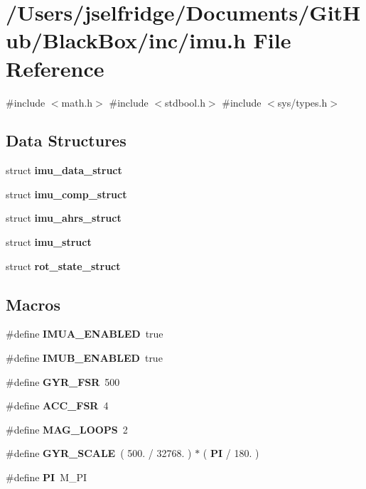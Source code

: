 \section{/\+Users/jselfridge/\+Documents/\+Git\+Hub/\+Black\+Box/inc/imu.h File Reference}
\label{imu_8h}
{\ttfamily \#include $<$math.\+h$>$}\newline
{\ttfamily \#include $<$stdbool.\+h$>$}\newline
{\ttfamily \#include $<$sys/types.\+h$>$}\newline
\subsection*{Data Structures}
\begin{DoxyCompactItemize}
\item 
struct \textbf{ imu\+\_\+data\+\_\+struct}
\item 
struct \textbf{ imu\+\_\+comp\+\_\+struct}
\item 
struct \textbf{ imu\+\_\+ahrs\+\_\+struct}
\item 
struct \textbf{ imu\+\_\+struct}
\item 
struct \textbf{ rot\+\_\+state\+\_\+struct}
\end{DoxyCompactItemize}
\subsection*{Macros}
\begin{DoxyCompactItemize}
\item 
\#define \textbf{ I\+M\+U\+A\+\_\+\+E\+N\+A\+B\+L\+ED}~true
\item 
\#define \textbf{ I\+M\+U\+B\+\_\+\+E\+N\+A\+B\+L\+ED}~true
\item 
\#define \textbf{ G\+Y\+R\+\_\+\+F\+SR}~500
\item 
\#define \textbf{ A\+C\+C\+\_\+\+F\+SR}~4
\item 
\#define \textbf{ M\+A\+G\+\_\+\+L\+O\+O\+PS}~2
\item 
\#define \textbf{ G\+Y\+R\+\_\+\+S\+C\+A\+LE}~( 500. / 32768. ) $\ast$ ( \textbf{ PI} / 180. )
\item 
\#define \textbf{ PI}~M\+\_\+\+PI
\end{DoxyCompactItemize}
